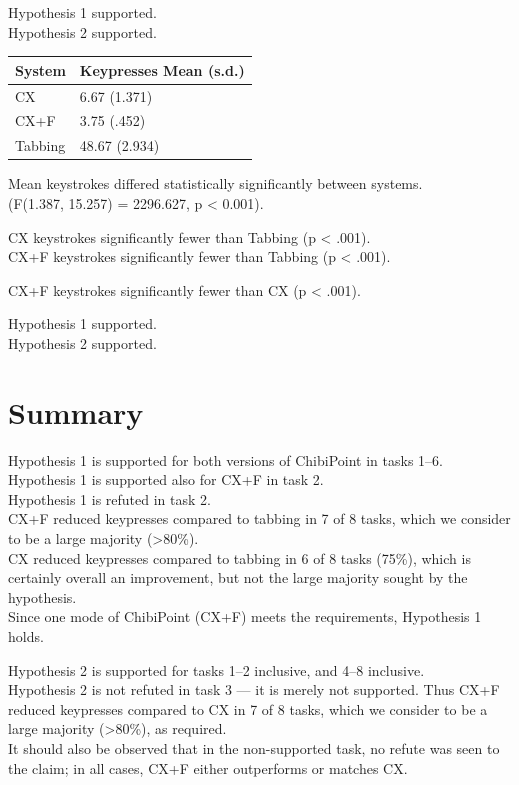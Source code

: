 \documentclass[a4paper, 12pt]{report}
\begin{document}
Hypothesis 1 supported.\\
Hypothesis 2 supported.

\begin{tabular}{l l}
\hline\hline %
System & Keypresses Mean (s.d.) \\ [0.5ex] %
\hline %
CX & 6.67 (1.371)\\
CX+F & 3.75 (.452)\\
Tabbing & 48.67 (2.934)\\ [1ex] %
\hline %
\end{tabular}

Mean keystrokes differed statistically significantly between systems.\\
(F(1.387, 15.257) = 2296.627, p < 0.001).

CX keystrokes significantly fewer than Tabbing (p < .001).\\
CX+F keystrokes significantly fewer than Tabbing (p < .001).

CX+F keystrokes significantly fewer than CX (p < .001).

Hypothesis 1 supported.\\
Hypothesis 2 supported.

\section{Summary}
Hypothesis 1 is supported for both versions of ChibiPoint in tasks 1--6.\\
Hypothesis 1 is supported also for CX+F in task 2.\\
Hypothesis 1 is refuted in task 2.\\
CX+F reduced keypresses compared to tabbing in 7 of 8 tasks, which we consider to be a large majority (>80\%).\\
CX reduced keypresses compared to tabbing in 6 of 8 tasks (75\%), which is certainly overall an improvement, but not the large majority sought by the hypothesis.\\
Since one mode of ChibiPoint (CX+F) meets the requirements, Hypothesis 1 holds.

Hypothesis 2 is supported for tasks 1--2 inclusive, and 4--8 inclusive.\\
Hypothesis 2 is not refuted in task 3 --- it is merely not supported.
Thus CX+F reduced keypresses compared to CX in 7 of 8 tasks, which we consider to be a large majority (>80\%), as required.\\
It should also be observed that in the non-supported task, no refute was seen to the claim; in all cases, CX+F either outperforms or matches CX.
\end{document}
